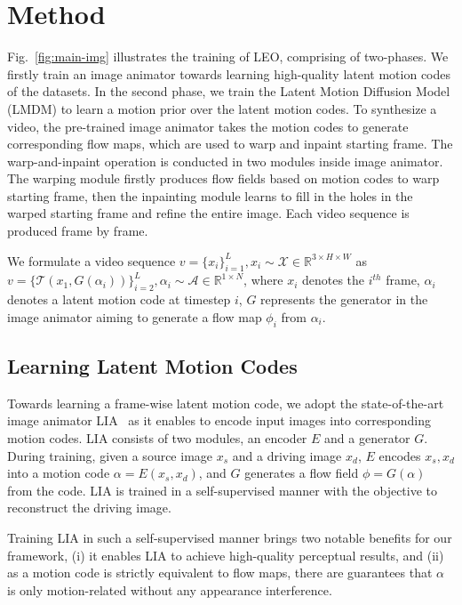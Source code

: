 {\section{Method}
Fig.~\ref{fig:main-img} illustrates the training of LEO, comprising of two-phases. We firstly train an image animator towards learning high-quality latent motion codes of the datasets. In the second phase, we train the Latent Motion Diffusion Model (LMDM) to learn a motion prior over the latent motion codes. To synthesize a video, the pre-trained image animator takes the motion codes to generate corresponding flow maps, which are used to warp and inpaint starting frame. The warp-and-inpaint operation is conducted in two modules inside image animator. The warping module firstly produces flow fields based on motion codes to warp starting frame, then the inpainting module learns to fill in the holes in the warped starting frame and refine the entire image. Each video sequence is produced frame by frame.

We formulate a video sequence $v = \{x_i\}^{L}_{i=1}, x_i\sim \mathcal{X}\in\mathbb{R}^{3\times H\times W}$ as $v = \{\mathcal{T}(x_1, G(\alpha_i))\}^{L}_{i=2}, \alpha_i\sim \mathcal{A}\in \mathbb{R}^{1\times N}$, where $x_i$ denotes the $i^{th}$ frame, $\alpha_i$ denotes a latent motion code at timestep $i$, $G$ represents the generator in the image animator aiming to generate a flow map $\phi_{i}$ from $\alpha_{i}$.

\subsection{Learning Latent Motion Codes}
Towards learning a frame-wise latent motion code, we adopt the state-of-the-art image animator LIA~\cite{wang2022latent} as it enables to encode input images into corresponding motion codes.  LIA consists of two modules, an encoder $E$ and a generator $G$. During training, given a source image $x_s$ and a driving image $x_d$, $E$ encodes $x_s, x_d$ into a motion code $\alpha = E(x_s, x_d)$, and $G$ generates a flow field $\phi = G(\alpha)$ from the code. LIA is trained in a self-supervised manner with the objective to reconstruct the driving image. 

Training LIA in such a self-supervised manner brings two notable benefits for our framework, (i) it enables LIA to achieve high-quality perceptual results, and (ii) as a motion code is strictly equivalent to flow maps, there are guarantees that $\alpha$ is only motion-related without any appearance interference. 

}
